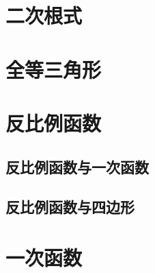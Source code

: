 
\chapter{二次根式}
\chapter{全等三角形}
\chapter{反比例函数}
\section{反比例函数与一次函数}
\section{反比例函数与四边形}
\chapter{一次函数}
